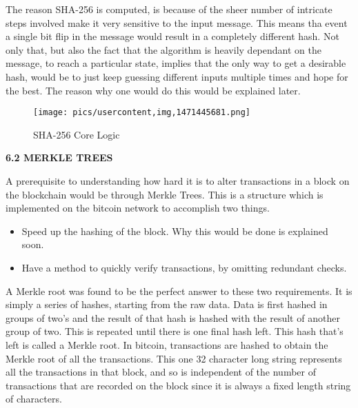 \documentclass[12pt,a4paper]{report}
\begin{document}
\begin{flushleft}
\vspace{10mm}
\newpage
The reason SHA-256 is computed, is because of the sheer number of intricate steps involved make it very sensitive to the input message. This means tha event a single bit flip in the message would result in a completely different hash. \newline
Not only that, but also the fact that the algorithm is heavily dependant on the message, to reach a particular state, implies that the only way to get a desirable hash, would be to just keep guessing different inputs multiple times and hope for the best. The reason why one would do this would be explained later.


\vspace{10mm}
\begin{figure}[h]
\centering
\caption{SHA-256 Core Logic}
\texttt{[image: pics/usercontent,img,1471445681.png]}
\end{figure}
\vspace{10mm}

\textbf{6.2 MERKLE TREES}
\vspace{10mm}

A prerequisite to understanding how hard it is to alter transactions in a block on the blockchain would be through Merkle Trees. This is a structure which is implemented on the bitcoin network to accomplish two things.
\begin{itemize}
    \item Speed up the hashing of the block. Why this would be done is explained soon.
    \item Have a method to quickly verify transactions, by omitting redundant checks.
\end{itemize}
\newpage
\vspace{10mm}

A Merkle root was found to be the perfect answer to these two requirements. It is simply a series of hashes, starting from the raw data. Data is first hashed in groups of two's and the result of that hash is hashed with the result of another group of two. This is repeated until there is one final hash left. This hash that's left is called a Merkle root. In bitcoin, transactions are hashed to obtain the Merkle root of all the transactions. This one 32 character long string represents all the transactions in that block, and so is independent of the number of transactions that are recorded on the block since it is always a fixed length string of characters.\newline


\end{flushleft}
\end{document}

